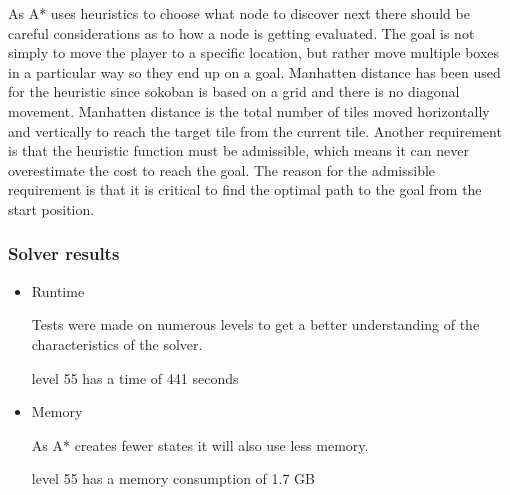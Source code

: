 \documentclass[../../maint.tex]{subfiles}
\begin{document}
As A* uses heuristics to choose what node to discover next there should be careful considerations as to how a node is 			getting evaluated. The goal is not simply to move the player to a specific location, but rather move multiple boxes in 		a particular way so they end up on a goal.
Manhatten distance has been used for the heuristic since sokoban is based on a grid and there is no diagonal movement. 			Manhatten distance is the total number of tiles moved horizontally and vertically to reach the target tile from the 			current tile. Another requirement is that the heuristic function must be admissible, which means it can never overestimate 	the cost to reach the goal. The reason for the admissible requirement is that it is critical to find the optimal path to 		the goal from the start position.

\subsubsection{Solver results}

 \begin{itemize}

	\item Runtime 		
 		
 	Tests were made on numerous levels to get a better understanding of the characteristics of the solver.
 		
 	level 55 has a time of 441 seconds
 		
	\item Memory
		
	As A* creates fewer states it will also use less memory. 
		
	level 55 has a memory consumption of 1.7 GB
		
 \end{itemize}
	
\end{document}
